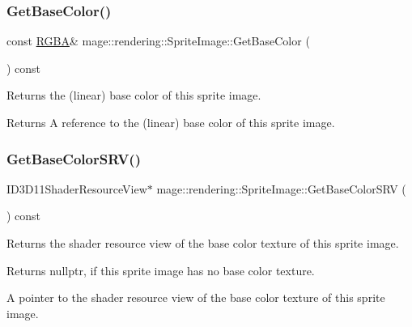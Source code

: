 \subsubsection{\texorpdfstring{Get\+Base\+Color()}{GetBaseColor()}\hspace{0.1cm}{\footnotesize\ttfamily [2/2]}}
{\footnotesize\ttfamily const \mbox{\hyperlink{structmage_1_1_r_g_b_a}{R\+G\+BA}}\& mage\+::rendering\+::\+Sprite\+Image\+::\+Get\+Base\+Color (\begin{DoxyParamCaption}{ }\end{DoxyParamCaption}) const\hspace{0.3cm}{\ttfamily [noexcept]}}

Returns the (linear) base color of this sprite image.

\begin{DoxyReturn}{Returns}
A reference to the (linear) base color of this sprite image. 
\end{DoxyReturn}
\mbox{\label{classmage_1_1rendering_1_1_sprite_image_a7dceee8dfe1432948a77f0563d6b70a3}} 
\subsubsection{\texorpdfstring{Get\+Base\+Color\+S\+R\+V()}{GetBaseColorSRV()}}
{\footnotesize\ttfamily I\+D3\+D11\+Shader\+Resource\+View$\ast$ mage\+::rendering\+::\+Sprite\+Image\+::\+Get\+Base\+Color\+S\+RV (\begin{DoxyParamCaption}{ }\end{DoxyParamCaption}) const\hspace{0.3cm}{\ttfamily [noexcept]}}

Returns the shader resource view of the base color texture of this sprite image.

\begin{DoxyReturn}{Returns}
{\ttfamily nullptr}, if this sprite image has no base color texture. 

A pointer to the shader resource view of the base color texture of this sprite image. 
\end{DoxyReturn}
\mbox{\label{classmage_1_1rendering_1_1_sprite_image_ab5b257c4df82dc72223affe8b32c0b70}} 
